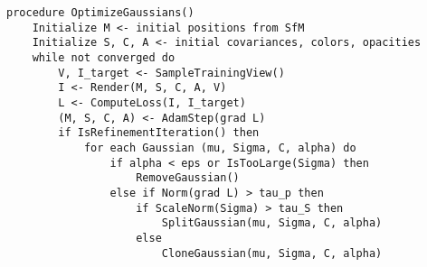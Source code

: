 \begin{lstlisting}[style=pseudocode,caption={Gaussian Splatting Optimization Algorithm}]
procedure OptimizeGaussians()
    Initialize M <- initial positions from SfM
    Initialize S, C, A <- initial covariances, colors, opacities
    while not converged do
        V, I_target <- SampleTrainingView()
        I <- Render(M, S, C, A, V)
        L <- ComputeLoss(I, I_target)
        (M, S, C, A) <- AdamStep(grad L)
        if IsRefinementIteration() then
            for each Gaussian (mu, Sigma, C, alpha) do
                if alpha < eps or IsTooLarge(Sigma) then
                    RemoveGaussian()
                else if Norm(grad L) > tau_p then
                    if ScaleNorm(Sigma) > tau_S then
                        SplitGaussian(mu, Sigma, C, alpha)
                    else
                        CloneGaussian(mu, Sigma, C, alpha)
\end{lstlisting}
